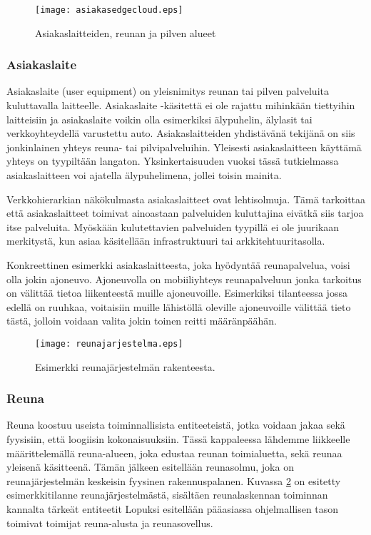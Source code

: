 \begin{figure}[tb]
\texttt{[image: asiakasedgecloud.eps]}
\caption{Asiakaslaitteiden, reunan ja pilven alueet} \label{fig:asiakasedgecloud}
\end{figure}

\subsubsection{Asiakaslaite}
Asiakaslaite (user equipment) on yleisnimitys reunan tai pilven palveluita kuluttavalla laitteelle.
Asiakaslaite -käsitettä ei ole rajattu mihinkään tiettyihin laitteisiin ja asiakaslaite voikin olla esimerkiksi älypuhelin, älylasit tai verkkoyhteydellä varustettu auto. 
Asiakaslaitteiden yhdistävänä tekijänä on siis jonkinlainen yhteys reuna- tai pilvipalveluihin. Yleisesti asiakaslaitteen käyttämä yhteys on tyypiltään langaton. 
Yksinkertaisuuden vuoksi tässä tutkielmassa asiakaslaitteen voi ajatella älypuhelimena, jollei toisin mainita.

Verkkohierarkian näkökulmasta asiakaslaitteet ovat lehtisolmuja. Tämä tarkoittaa että asiakaslaitteet toimivat ainoastaan palveluiden kuluttajina eivätkä siis tarjoa itse palveluita. Myöskään kulutettavien palveluiden tyypillä ei ole juurikaan merkitystä, kun asiaa käsitellään infrastruktuuri tai arkkitehtuuritasolla.

Konkreettinen esimerkki asiakaslaitteesta, joka hyödyntää reunapalvelua, voisi olla jokin ajoneuvo.
Ajoneuvolla on mobiiliyhteys reunapalveluun jonka tarkoitus on välittää tietoa liikenteestä muille ajoneuvoille. Esimerkiksi tilanteessa jossa edellä on ruuhkaa, voitaisiin muille lähistöllä oleville ajoneuvoille välittää tieto tästä, jolloin voidaan valita jokin toinen reitti määränpäähän.

\begin{figure}[tb]
\texttt{[image: reunajarjestelma.eps]}
\caption{Esimerkki reunajärjestelmän rakenteesta.} \label{fig:reunajarjestelma}
\end{figure}


\subsubsection{Reuna} \label{reunatoimijat}
Reuna koostuu useista toiminnallisista entiteeteistä, jotka voidaan jakaa sekä fyysisiin, että loogiisin kokonaisuuksiin. 
Tässä kappaleessa lähdemme liikkeelle määrittelemällä reuna-alueen, joka edustaa reunan toimialuetta, sekä reunaa yleisenä käsitteenä.
Tämän jälkeen esitellään reunasolmu, joka on reunajärjestelmän keskeisin fyysinen rakennuspalanen.
Kuvassa \ref{fig:reunajarjestelma} on esitetty esimerkkitilanne reunajärjestelmästä, sisältäen reunalaskennan toiminnan kannalta tärkeät entiteetit
Lopuksi esitellään pääasiassa ohjelmallisen tason toimivat toimijat reuna-alusta ja reunasovellus.

